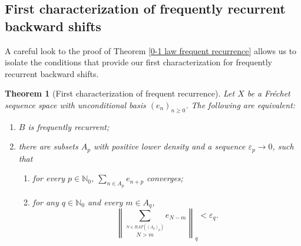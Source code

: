 \documentclass[11pt]{amsart}
\newtheorem{theorem}{Theorem}[section]
\newtheorem{remark}[theorem]{Remark}
\newcommand{\zN}{\mathbb N}
\newcommand{\sub}{\subseteq}
\begin{document}
 



\subsection{First characterization of frequently recurrent backward shifts\label{section 0-1 general case, primera caracterizacion}}
A careful look to the proof of Theorem \ref{0-1 law frequent recurrence} allows us to isolate  the conditions that provide our first characterization for frequently recurrent backward shifts.



\begin{theorem}[First characterization of frequent recurrence]\label{Characterization frequent recurrence}
{Let $X$ be a Fr\'echet sequence space with unconditional basis $(e_n)_{n\geq 0}$. The following are equivalent: }
\begin{enumerate}
\item $B$ is frequently recurrent;
\item
 there are subsets $A_p$ with positive lower density 
 and a sequence $\varepsilon_p\to 0$,  such that
\begin{enumerate}
    \item [i)]for every $p\in\mathbb N_0$, $\sum_{n\in A_p}e_{n+p}$ converges; 
    \item [ii)]
    for any $q\in\mathbb N_0$ and every  $m\in A_q$,
    $$
    \left\|\sum_{\overset{N\in RAT((A_p)_p)}{N>m}} e_{N-m}\right\|_q<\varepsilon_q.
    $$
\end{enumerate}

\end{enumerate}
\end{theorem}  
\end{document}
